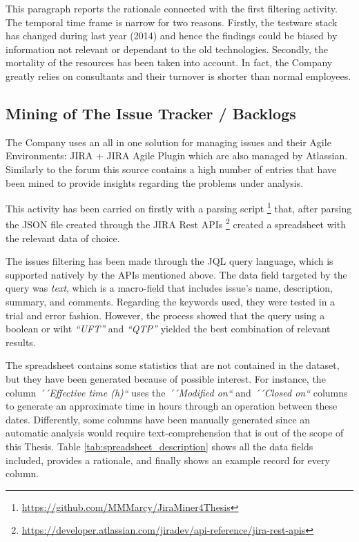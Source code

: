 This paragraph reports the rationale connected with the first filtering activity. The temporal time frame is narrow for two reasons. Firstly, the testware stack has changed during last year (2014) and hence the findings could be biased by information not relevant or dependant to the old technologies. Secondly, the mortality of the resources has been taken into account. In fact, the Company greatly relies on consultants and their turnover is shorter than normal employees. 

\subsection{Mining of The Issue Tracker / Backlogs} \label{mining_issue_tracker}
The Company uses an all in one solution for managing issues and their Agile Environments: JIRA + JIRA Agile Plugin which are also managed by Atlassian. Similarly to the forum this source contains a high number of entries that have been mined to provide insights regarding the problems under analysis.

This activity has been carried on firstly with a parsing script \footnote{\href{https://github.com/MMMarcy/JiraMiner4Thesis}{https://github.com/MMMarcy/JiraMiner4Thesis}} that, after parsing the JSON file created through the JIRA Rest APIs \footnote{\href{https://developer.atlassian.com/jiradev/api-reference/jira-rest-apis}{https://developer.atlassian.com/jiradev/api-reference/jira-rest-apis}} created a spreadsheet with the relevant data of choice.

The issues filtering has been made through the JQL query language, which is supported natively by the APIs mentioned above. The data field targeted by the query was \textit{text}, which is a macro-field that includes issue's name, description, summary, and comments. Regarding the keywords used, they were tested in a trial  and error fashion. However, the process showed that the query using a boolean or wiht \textit{``UFT''} and \textit{``QTP''} yielded the best combination of relevant results.

The spreadsheet contains some statistics that are not contained in the dataset, but they have been generated because of possible interest. For instance, the column \textit{´´Effective time (h)``} uses the \textit{´´Modified on``} and \textit{´´Closed on``} columns to generate an approximate time in hours through an operation between these dates. Differently, some columns have been manually generated since an automatic analysis would require text-comprehension that is out of the scope of this Thesis. Table \ref{tab:spreadsheet_description} shows all the data fields included, provides a rationale, and finally shows an example record for every column.



